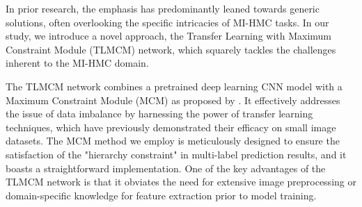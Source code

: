\documentclass[wcp]{jmlr}
\begin{document}

In prior research, the emphasis has predominantly leaned towards generic solutions, often overlooking the specific intricacies of MI-HMC tasks. In our study, we introduce a novel approach, the Transfer Learning with Maximum Constraint Module (TLMCM) network, which squarely tackles the challenges inherent to the MI-HMC domain.

The TLMCM network combines a pretrained deep learning CNN model with a Maximum Constraint Module (MCM) as proposed by \cite{Giunchiglia01}. It effectively addresses the issue of data imbalance by harnessing the power of transfer learning techniques, which have previously demonstrated their efficacy on small image datasets. The MCM method we employ is meticulously designed to ensure the satisfaction of the "hierarchy constraint" in multi-label prediction results, and it boasts a straightforward implementation. One of the key advantages of the TLMCM network is that it obviates the need for extensive image preprocessing or domain-specific knowledge for feature extraction prior to model training.

\end{document}
